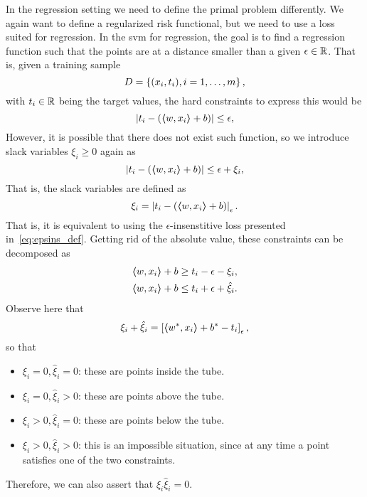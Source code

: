 In the regression setting we need to define the primal problem differently. We again want to define a regularized risk functional, but we need to use a loss suited for regression. In the \acrshort{svm} for regression, the goal is to find a regression function such that the points are at a distance smaller than a given $\epsilon \in \mathbb{R}$. 
%
That is, given a training sample 
$$ D = \left\{(x_i, t_i), i=1, \ldots, m\right\}, $$
with $t_i \in \mathbb{R}$ being the target values, the hard constraints to express this would be 
\begin{equation}
    \nonumber
    \left|t_i - (\bm{\left\langle} w, x_i \bm{\right\rangle} + b) \right| \leq \epsilon,
\end{equation}
However, it is possible that there does not exist such function, so we introduce slack variables $\xi_i \geq 0$ again as
\begin{equation}
    \nonumber
    \left|t_i - (\bm{\left\langle} w, x_i \bm{\right\rangle} + b) \right| \leq \epsilon + \xi_i,
\end{equation}
That is, the slack variables are defined as 
\begin{equation}
    \xi_i = \left|t_i - (\bm{\left\langle} w, x_i \bm{\right\rangle} + b)\right|_\epsilon .
\end{equation}
That is, it is equivalent to using the $\epsilon$-insenstitive loss presented in~\eqref{eq:epsins_def}.
Getting rid of the absolute value, these constraints can be decomposed as
\begin{equation}
    \nonumber
    \begin{aligned}
        \bm{\left\langle} w, x_i \bm{\right\rangle} + b &\geq t_i - \epsilon - \xi_i , \\
        \bm{\left\langle} w, x_i \bm{\right\rangle} + b &\leq t_i + \epsilon + \hat{\xi}_i.
    \end{aligned}
\end{equation}
Observe here that $$ \xi_i + \hat{\xi}_i = \left[\bm{\left\langle} {w}^*, x_i \bm{\right\rangle} + {b}^* - t_i\right]_{\epsilon} ,$$
so that
\begin{itemize}
    \item $\xi_i = 0, \hat{\xi}_i = 0$: these are points inside the tube.
    \item $\xi_i = 0, \hat{\xi}_i > 0$: these are points above the tube.
    \item $\xi_i > 0, \hat{\xi}_i = 0$: these are points below the tube.
    \item $\xi_i > 0, \hat{\xi}_i > 0$: this is an impossible situation, since at any time a point satisfies one of the two constraints.
\end{itemize}
Therefore, we can also assert that $\xi_i \hat{\xi}_i = 0$.

